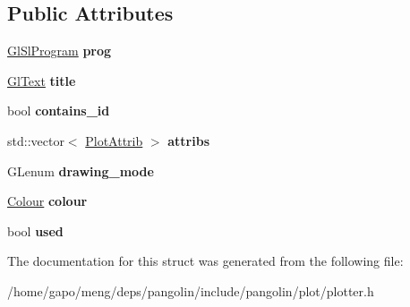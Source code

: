 \subsection*{Public Attributes}
\begin{DoxyCompactItemize}
\item 
\hyperlink{classpangolin_1_1_gl_sl_program}{Gl\+Sl\+Program} {\bfseries prog}\hypertarget{structpangolin_1_1_plotter_1_1_plot_series_a0443889134161b24069807529ea0609b}{}\label{structpangolin_1_1_plotter_1_1_plot_series_a0443889134161b24069807529ea0609b}

\item 
\hyperlink{classpangolin_1_1_gl_text}{Gl\+Text} {\bfseries title}\hypertarget{structpangolin_1_1_plotter_1_1_plot_series_ac2bdf52f47e31491d983c4f06d098243}{}\label{structpangolin_1_1_plotter_1_1_plot_series_ac2bdf52f47e31491d983c4f06d098243}

\item 
bool {\bfseries contains\+\_\+id}\hypertarget{structpangolin_1_1_plotter_1_1_plot_series_a1d5eda377aa9316c2ed56f48c9a90782}{}\label{structpangolin_1_1_plotter_1_1_plot_series_a1d5eda377aa9316c2ed56f48c9a90782}

\item 
std\+::vector$<$ \hyperlink{structpangolin_1_1_plotter_1_1_plot_attrib}{Plot\+Attrib} $>$ {\bfseries attribs}\hypertarget{structpangolin_1_1_plotter_1_1_plot_series_aea39271d794d57a0c3485531d4d0a1a4}{}\label{structpangolin_1_1_plotter_1_1_plot_series_aea39271d794d57a0c3485531d4d0a1a4}

\item 
G\+Lenum {\bfseries drawing\+\_\+mode}\hypertarget{structpangolin_1_1_plotter_1_1_plot_series_aebef14bc3a2d65ce9862392f163e579b}{}\label{structpangolin_1_1_plotter_1_1_plot_series_aebef14bc3a2d65ce9862392f163e579b}

\item 
\hyperlink{structpangolin_1_1_colour}{Colour} {\bfseries colour}\hypertarget{structpangolin_1_1_plotter_1_1_plot_series_acc34aa72785115f44d771d6d3d5a4c2c}{}\label{structpangolin_1_1_plotter_1_1_plot_series_acc34aa72785115f44d771d6d3d5a4c2c}

\item 
bool {\bfseries used}\hypertarget{structpangolin_1_1_plotter_1_1_plot_series_af89701d1d669f9a5afe70c3c3a3c1eba}{}\label{structpangolin_1_1_plotter_1_1_plot_series_af89701d1d669f9a5afe70c3c3a3c1eba}

\end{DoxyCompactItemize}


The documentation for this struct was generated from the following file\+:\begin{DoxyCompactItemize}
\item 
/home/gapo/meng/deps/pangolin/include/pangolin/plot/plotter.\+h\end{DoxyCompactItemize}
